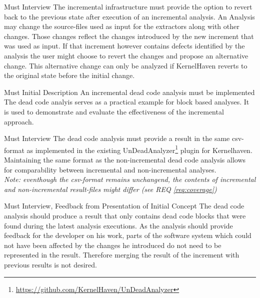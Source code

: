 \documentclass[a4paper]{article}
\begin{document}
\begin{req} \label{req:rollback}
\reqtable
	{Must}  {Interview}
	{The incremental infrastructure must provide the option to revert back to the previous state after execution of an incremental analysis.}
	{An Analysis may change the source-files used as input for the extractors along with other changes. Those changes reflect the changes introduced by the new increment that was used as input. If that increment however contains defects identified by the analysis the user might choose to revert the changes and propose an alternative change. This alternative change can only be analyzed if KernelHaven reverts to the original state before the initial change.}

\end{req}

\begin{req} \label{req:dead-code-analysis}
\reqtable
	{Must}  {Initial Description}
	{An incremental dead code analysis must be implemented}
	{The dead code analyis serves as a practical example for block based analyses. It is used to demonstrate and evaluate the effectiveness of the incremental approach.}
	
	\begin{subreq} \label{req:format}
    \reqtable
    {Must}  {Interview}
	{The dead code analysis must provide a result in the same csv-format as implemented in the existing UnDeadAnalyzer\footnote{\url{https://github.com/KernelHaven/UnDeadAnalyzer}} plugin for Kernelhaven.}
	{Maintaining the same format as the non-incremental dead code analysis allows for comparability between incremental and non-incremental analyses. \\
	\emph{Note: eventhough the csv-format remains unchangend, the contents of incremental and non-incremental result-files might differ (see REQ \ref{req:coverage})}}
	\end{subreq}
	
	\begin{subreq} \label{req:coverage}
    \reqtable
    {Must}  {Interview, Feedback from Presentation of Initial Concept}
	{The dead code analysis should produce a result that only contains dead code blocks that were found during the latest analysis executions.}
	{As the analysis should provide feedback for the developer on his work, parts of the software system which could not have been affected by the changes he introduced do not need to be represented in the result. Therefore merging the result of the increment with previous results is not desired.}
	\end{subreq}
\end{req}
\end{document}

